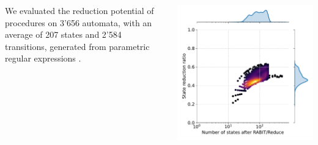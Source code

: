 \documentclass[25pt, a1paper, portrait]{tikzposter}
\begin{document}
\begin{columns}
    {
        We evaluated the reduction potential of procedures on 3'656 automata, with an average of 207 states and 2'584 transitions, generated from parametric regular expressions \cite{Regex}.

        \begin{tikzfigure}
            \centering
            \begin{minipage}{0.21\textwidth}
                \centering
                \includegraphics[width=1\linewidth]{images/intersect-all-states.pdf}
            \end{minipage}
            \begin{minipage}{0.21\textwidth}
                \centering

\end{minipage}
\end{tikzfigure}}
\end{columns}
\end{document}
